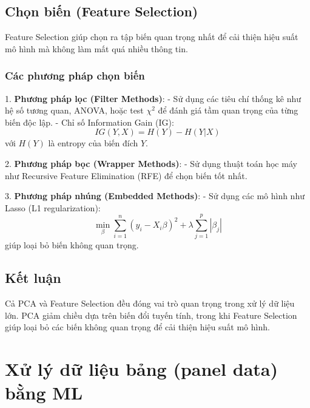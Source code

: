 \subsection{Chọn biến (Feature Selection)}
Feature Selection giúp chọn ra tập biến quan trọng nhất để cải thiện hiệu suất mô hình mà không làm mất quá nhiều thông tin.

\subsubsection{Các phương pháp chọn biến}

1. \textbf{Phương pháp lọc (Filter Methods)}:
   - Sử dụng các tiêu chí thống kê như hệ số tương quan, ANOVA, hoặc test $\chi^2$ để đánh giá tầm quan trọng của từng biến độc lập.
   - Chỉ số Information Gain (IG):
     \begin{equation}
     IG(Y, X) = H(Y) - H(Y | X)
     \end{equation}
     với $H(Y)$ là entropy của biến đích $Y$.

2. \textbf{Phương pháp bọc (Wrapper Methods)}:
   - Sử dụng thuật toán học máy như Recursive Feature Elimination (RFE) để chọn biến tốt nhất.

3. \textbf{Phương pháp nhúng (Embedded Methods)}:
   - Sử dụng các mô hình như Lasso (L1 regularization):
     \begin{equation}
     \min_\beta \sum_{i=1}^{n} (y_i - X_i \beta)^2 + \lambda \sum_{j=1}^{p} |\beta_j|
     \end{equation}
     giúp loại bỏ biến không quan trọng.

\subsection{Kết luận}
Cả PCA và Feature Selection đều đóng vai trò quan trọng trong xử lý dữ liệu lớn. PCA giảm chiều dựa trên biến đổi tuyến tính, trong khi Feature Selection giúp loại bỏ các biến không quan trọng để cải thiện hiệu suất mô hình.



\section{Xử lý dữ liệu bảng (panel data) bằng ML}
